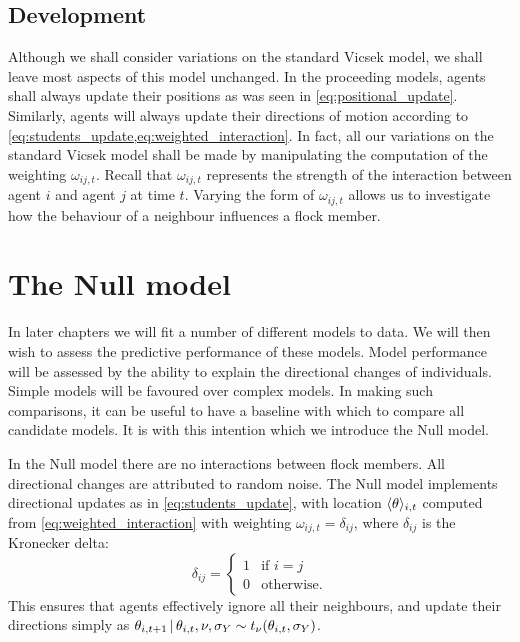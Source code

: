 \subsection{Development}

Although we shall consider variations on the standard Vicsek model, we shall
leave most aspects of this model unchanged. In the proceeding models, agents
shall always update their positions as was seen in \cref{eq:positional_update}.
Similarly, agents will always update their directions of motion according to
\cref{eq:students_update,eq:weighted_interaction}. In fact, all our variations
on the standard Vicsek model shall be made by manipulating the computation of
the weighting $\omega_{ij,t}$. Recall that $\omega_{ij,t}$ represents the
strength of the interaction between agent $i$ and agent $j$ at time $t$.
Varying the form of $\omega_{ij,t}$ allows us to investigate how the behaviour
of a neighbour influences a flock member.

\section{The Null model}

In later chapters we will fit a number of different models to data. We will
then wish to assess the predictive performance of these models. Model
performance will be assessed by the ability to explain the directional changes
of individuals. Simple models will be favoured over complex models. In making
such comparisons, it can be useful to have a baseline with which to compare all
candidate models. It is with this intention which we introduce the Null model.

In the Null model there are no interactions between flock members. All
directional changes are attributed to random noise. The Null model implements
directional updates as in \cref{eq:students_update}, with location
$\langle\theta\rangle_{i,t}$ computed from \cref{eq:weighted_interaction} with
weighting $\omega_{ij,t}=\delta_{ij}$, where $\delta_{ij}$ is the Kronecker
delta:
\begin{equation*}
  \delta_{ij} =
  \begin{cases}
    1 & \text{if } i=j \\
    0 & \text{otherwise.}
  \end{cases}
\end{equation*}
This ensures that agents effectively ignore all their neighbours, and update
their directions simply as $\theta_{i,t+1} \,|\, \theta_{i,t}, \nu, \sigma_Y
\sim t_\nu(\theta_{i,t}, \sigma_Y)$.

